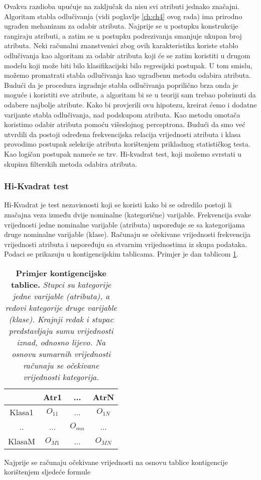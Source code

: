 Ovakva razdioba upućuje na zaključak da nisu svi atributi jednako značajni. Algoritam stabla odlučivanja (vidi poglavlje \ref{ch:ch4} ovog rada) ima prirodno ugrađen mehanizam za odabir atributa. Najprije se u postupku konstrukcije rangiraju atributi, a zatim se u postupku podrezivanja smanjuje ukupan broj atributa. Neki računalni znanstvenici\cite{Grabczewski01} zbog ovih karakteristika koriste stablo odlučivanja kao algoritam za odabir atributa koji će se zatim koristiti u drugom modelu koji može biti bilo klasifikacijski bilo regresijski postupak. U tom smislu, možemo promatrati stabla odlučivanja kao ugradbenu metodu odabira atributa. Budući da je procedura izgradnje stabla odlučivanja poprilično brza onda je moguće i koristiti sve atribute, a algoritam bi se u teoriji sam trebao pobrinuti da odabere najbolje atribute.
Kako bi provjerili ovu hipotezu, kreirat ćemo i dodatne varijante stabla odlučivanja, nad podskupom atributa. Kao metodu omotača koristimo odabir atributa pomoću višeslojnog perceptrona.
Budući da smo već utvrdili da postoji određena frekvencijska relacija vrijednosti atributa i klasa provodimo postupak selekcije atributa korištenjem prikladnog statističkog testa. Kao logičan postupak nameće se tzv. Hi-kvadrat test, koji možemo svrstati u skupinu filterskih metoda odabira atributa.
\subsubsection{Hi-Kvadrat test}
Hi-Kvadrat je test nezavisnosti koji se koristi kako bi se odredilo postoji li značajna veza između dvije nominalne (kategorične) varijable. Frekvencija svake vrijednosti jedne nominalne varijable (atributa) uspoređuje se sa kategorijama druge nominalne varijable (klase). Računaju se očekivane vrijednosti frekvencija vrijednosti atributa i uspoređuju sa stvarnim vrijednostima iz skupa podataka. Podaci se prikazuju u kontigencijskim tablicama. Primjer je dan tablicom \ref{tab:contig}.
\begin{center}
    \begin{table}[!ht]
    \caption[Kontigencijska tablica]{
    \label{tab:contig}
    \textbf{Primjer kontigencijske tablice.} \textit{Stupci su kategorije jedne varijable (atributa), a redovi kategorije druge varijable (klase). Krajnji redak i stupac predstavljaju sumu vrijednosti iznad, odnosno lijevo. Na osnovu sumarnih vrijednosti računaju se očekivane vrijednosti kategorija.}}
   \centering
   \begin{tabular}{||c | c | c | c ||}
   \hline
     & Atr1 & ... & AtrN \\ [0.5ex]
   \hline\hline
   Klasa1 & $O_{11}$ & ... & $O_{1N}$  \\
   ..     & ...    & $O_{mn}$ & ...  \\
   KlasaM & $O_{M1}$ & ... & $O_{MN}$  \\ [1ex]
    \hline
    \end{tabular}
    \end{table}
\end{center}
Najprije se računaju očekivane vrijednosti na osnovu tablice kontigencije korištenjem sljedeće formule

